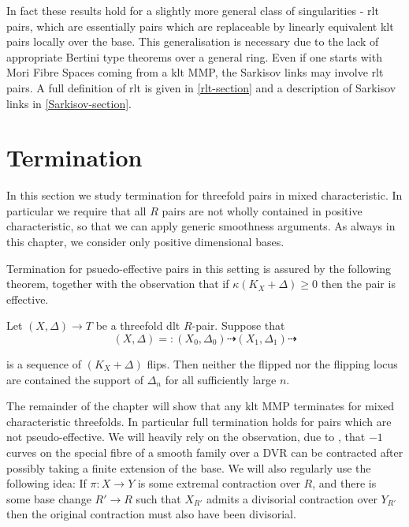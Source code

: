 	In fact these results hold for a slightly more general class of singularities - rlt pairs, which are essentially pairs which are replaceable by linearly equivalent klt pairs locally over the base. This generalisation is necessary due to the lack of appropriate Bertini type theorems over a general ring. Even if one starts with Mori Fibre Spaces coming from a klt MMP, the Sarkisov links may involve rlt pairs. A full definition of rlt is given in \autoref{rlt-section} and a description of Sarkisov links in \autoref{Sarkisov-section}.
	

	\section{Termination}
		
	In this section we study termination for threefold pairs in mixed characteristic. In particular we require that all $R$ pairs are not wholly contained in positive characteristic, so that we can apply generic smoothness arguments. As always in this chapter, we consider only positive dimensional bases.
	
	Termination for psuedo-effective pairs in this setting is assured by the following theorem, together with the observation that if $\kappa(K_{X}+\Delta) \geq 0$ then the pair is effective. 
	
	\begin{theorem}\cite[Proposition 9.20]{bhatt2020}\label{partial-termination}
		Let $(X,\Delta)\to T$ be a threefold dlt $R$-pair. Suppose that
		$$(X,\Delta)=:(X_{0},\Delta_{0}) \dashrightarrow (X_{1},\Delta_{1}) \dashrightarrow$$
		
		is a sequence of $(K_{X}+\Delta)$ flips. Then neither the flipped nor the flipping locus are contained the support of $\Delta_{n}$ for all sufficiently large $n$.
	\end{theorem}


	The remainder of the chapter will show that any klt MMP terminates for mixed characteristic threefolds. In particular full termination holds for pairs which are not pseudo-effective. We will heavily rely on the observation, due to \cite{KU}, that $-1$ curves on the special fibre of a smooth family over a DVR can be contracted after possibly taking a finite extension of the base. We will also regularly use the following idea: If $\pi:X \to Y$ is some extremal contraction over $R$, and there is some base change $R' \to R$ such that $X_{R'}$ admits a divisorial contraction over $Y_{R'}$ then the original contraction must also have been divisorial.


